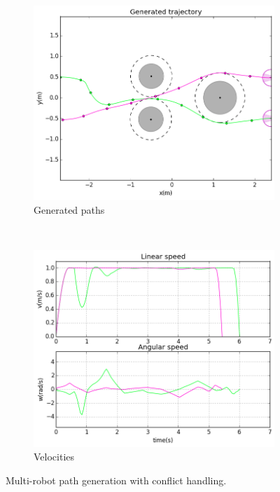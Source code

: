 \begin{figure}[!h]
        \centering
        ~ %
        \begin{subfigure}[b]{0.48\textwidth}
                \includegraphics[width=\textwidth]{./images/pnc.png}
                \caption{Generated paths}\label{fig:pnc}
        \end{subfigure}
        ~ %
        \begin{subfigure}[b]{0.48\textwidth}
                \includegraphics[width=\textwidth]{./images/vnc.png}
                \caption{Velocities}\label{fig:vnc}
        \end{subfigure}
        \caption{Multi-robot path generation with conflict handling.}\label{fig:nc}
\end{figure}

